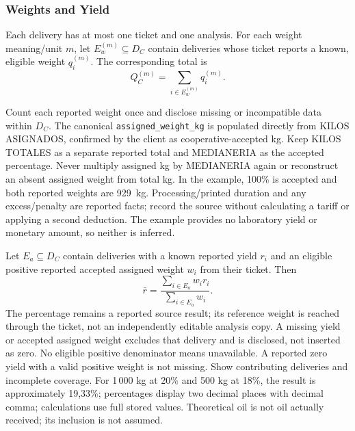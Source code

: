 \subsubsection{Weights and Yield}
Each delivery has at most one ticket and one analysis. For each weight meaning/unit
\(m\), let \(E_w^{(m)}\subseteq D_C\) contain deliveries whose ticket reports a known,
eligible weight \(q_i^{(m)}\). The corresponding total is
\[
Q_C^{(m)}=\sum_{i\in E_w^{(m)}}q_i^{(m)}.
\]

Count each reported weight once and disclose missing or incompatible data within
\(D_C\). The canonical \texttt{assigned\_weight\_kg} is populated directly from
KILOS ASIGNADOS, confirmed by the client as cooperative-accepted kg. Keep KILOS
TOTALES as a separate reported total and MEDIANERIA as the accepted percentage.
Never multiply assigned kg by MEDIANERIA again or reconstruct an absent assigned
weight from total kg. In the example, 100\% is accepted and both reported weights
are 929~kg. Processing/printed duration and any excess/penalty are reported facts;
record the source without calculating a tariff or applying a second deduction.
The example provides no laboratory yield or monetary amount, so neither is inferred.

Let \(E_a\subseteq D_C\) contain deliveries with a known reported yield \(r_i\)
and an eligible positive reported accepted assigned weight \(w_i\) from their ticket. Then
\[
\bar r=\frac{\sum_{i\in E_a}w_i r_i}{\sum_{i\in E_a}w_i}.
\]
The percentage remains a reported source result; its reference weight is reached
through the ticket, not an independently editable analysis copy. A missing yield
or accepted assigned weight excludes that delivery and is disclosed, not inserted as zero.
No eligible positive denominator means unavailable. A reported zero yield with a
valid positive weight is not missing. Show contributing deliveries and incomplete
coverage. For 1\,000 kg at 20\% and 500 kg at 18\%, the result is approximately
19,33\%; percentages display two decimal places with decimal comma; calculations use full stored values.
Theoretical oil is not oil actually received; its inclusion is not assumed.


